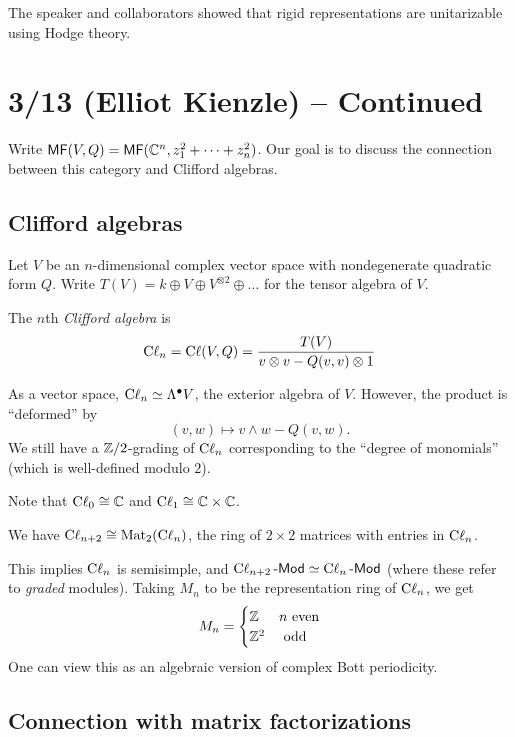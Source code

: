 \documentclass{article}
\begin{document}
The speaker and collaborators showed that rigid representations are unitarizable using Hodge theory.

\section{3/13 (Elliot Kienzle) -- Continued}

Write $\mathsf{MF}(V, Q) = \mathsf{MF}(\mathbb{C}^n, z_1^2 + \dots + z_n^2)$.
Our goal is to discuss the connection between this category and Clifford algebras.

\subsection{Clifford algebras}

Let $V$ be an $n$-dimensional complex vector space with nondegenerate quadratic form $Q$.
Write $T(V) = k \oplus V \oplus V^{\otimes 2} \oplus \dots$ for the tensor algebra of $V$.

\begin{dfn}
	The $n$th \emph{Clifford algebra} is
	\[
		\operatorname{C\ell}_n = \operatorname{C\ell}(V, Q) = \frac{T(V)}{v \otimes v - Q(v, v) \otimes 1}
	\]
\end{dfn}

As a vector space, $\operatorname{C\ell}_n \simeq \Lambda^\bullet V$, the exterior algebra of $V$.
However, the product is ``deformed'' by
\[
	(v, w) \mapsto v \wedge w - Q(v, w).
\]
We still have a $\mathbb{Z}/2$-grading of $\operatorname{C\ell}_n$ corresponding to the ``degree of monomials'' (which is well-defined modulo $2$).

Note that $\operatorname{C\ell}_0 \cong \mathbb{C}$ and $\operatorname{C\ell}_1 \cong \mathbb{C} \times \mathbb{C}$.

\begin{thm}
	We have $\operatorname{C\ell}_{n+2} \cong \operatorname{Mat}_2(\operatorname{C\ell}_n)$, the ring of $2 \times 2$ matrices with entries in $\operatorname{C\ell}_n$.
\end{thm}

This implies $\operatorname{C\ell}_n$ is semisimple, and $\operatorname{C\ell}_{n+2}\text{-}\mathsf{Mod} \simeq \operatorname{C\ell}_n\text{-}\mathsf{Mod}$ (where these refer to \emph{graded} modules).
Taking $M_n$ to be the representation ring of $\operatorname{C\ell}_n$, we get
\[
	M_n = \begin{cases}
		\mathbb{Z} & n \textrm{ even} \\
		\mathbb{Z}^2 & \textrm{ odd}
	\end{cases}
\]
One can view this as an algebraic version of complex Bott periodicity.

\subsection{Connection with matrix factorizations}
\end{document}
